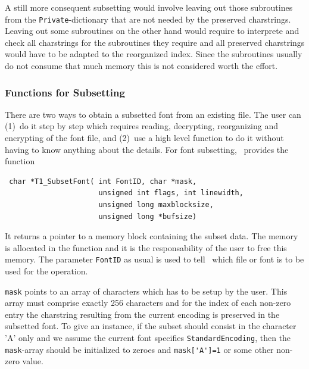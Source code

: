 A still more consequent subsetting would involve leaving out those subroutines
from the \verb+Private+-dictionary that are not needed by the preserved
charstrings. Leaving out some subroutines on the other hand would require to
interprete and check all charstrings for the subroutines they require and all
preserved charstrings would have to be adapted to the reorganized index. Since
the subroutines usually do not consume that much memory this is not considered
worth the effort.

\subsubsection{Functions for Subsetting}
\label{Functions for Subsetting}%

There are two ways to obtain a subsetted font from an existing file. The user
can (1)~do it step by step which requires reading, decrypting, reorganizing
and encrypting of the font file, and (2)~use a high level function to do it
without having to know anything about the details. For font subsetting,
\tonelib\ provides the function 
\precorr
\begin{verbatim}
 char *T1_SubsetFont( int FontID, char *mask,
                      unsigned int flags, int linewidth,
                      unsigned long maxblocksize,
                      unsigned long *bufsize)
\end{verbatim}\postcorr
It returns a pointer to a memory block containing the subset data. The memory
is allocated in the function and it is the responsability of the user to
free this memory. The parameter \verb+FontID+ as usual is used to tell
\tonelib\ which file or font is to be used for the operation. 

\verb+mask+ points to an array of characters which has to be setup by the
user. This array must comprise exactly 256 characters and for the index of
each non-zero entry the charstring resulting from the current encoding is
preserved in the subsetted font. To give an instance, if the subset should
consist in the character 'A' only and we assume the current font specifies
\verb+StandardEncoding+, then the \verb+mask+-array should be initialized to
zeroes and \verb+mask['A']=1+ or some other non-zero value.

